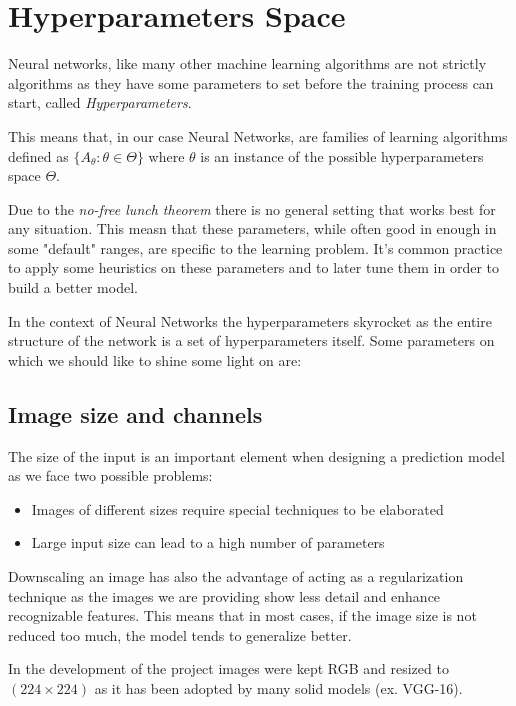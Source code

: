 \newpage


\section{Hyperparameters Space}
\label{sec:hyperparameters-space}
Neural networks, like many other machine learning algorithms are not strictly algorithms as they have some parameters to
set before the training process can start, called \textit{Hyperparameters}.

This means that, in our case Neural Networks, are families of learning algorithms defined as $\{A_\theta : \theta \in \Theta\}$
where $\theta$ is an instance of the possible hyperparameters space $\Theta$.

Due to the \textit{no-free lunch theorem} there is no general setting that works best for any situation. This measn
that these parameters, while often good in enough in some "default" ranges, are specific to the learning problem.
It's common practice to apply some heuristics on these parameters and to later tune them in order to build a better model.

In the context of Neural Networks the hyperparameters skyrocket as the entire structure of the network
is a set of hyperparameters itself. Some parameters on which we should like to shine some light on are:

\subsection{Image size and channels}
\label{subsec:image-size-and-channels}
The size of the input is an important element when designing a prediction model as we face two possible problems:
\begin{itemize}
    \item Images of different sizes require special techniques to be elaborated
    \item Large input size can lead to a high number of parameters
\end{itemize}

Downscaling an image has also the advantage of acting as a regularization technique as the images we are providing
show less detail and enhance recognizable features.
This means that in most cases, if the image size is not reduced too much, the model tends to generalize better.

In the development of the project images were kept RGB and resized to $(224 \times 224)$ as it has been adopted by many
solid models (ex. VGG-16).
